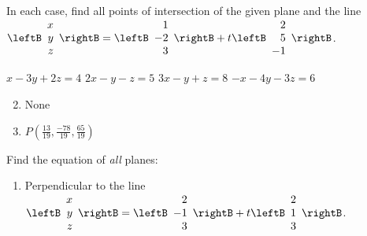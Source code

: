 \begin{multicols}{2}
\begin{ex}
In each case, find all points of intersection of the given plane and the line \newline$\leftB
\begin{array}{r}
x\\
y\\
z
\end{array}
\rightB
=
\leftB
\begin{array}{r}
1\\
-2\\
3
\end{array}
\rightB
+t
\leftB
\begin{array}{r}
2\\
5\\
-1
\end{array}
\rightB$.

\begin{exenumerate}
\exitem $x -3y + 2z = 4$
\exitem $2x - y - z = 5$
\exitem $3x - y + z = 8$
\exitem $-x -4y -3z = 6$
\end{exenumerate}
\begin{sol}
\begin{enumerate}[label={\alph*.}]
\setcounter{enumi}{1}
\item  None

\setcounter{enumi}{3}
\item  $P(\frac{13}{19}, \frac{-78}{19}, \frac{65}{19})$


\end{enumerate}
\end{sol}
\end{ex}

\begin{ex}
Find the equation of \textit{all} planes:


\begin{enumerate}[label={\alph*.}]
\item Perpendicular to the line  \\
$\leftB
\begin{array}{r}
x\\
y\\
z
\end{array}
\rightB
=
\leftB
\begin{array}{r}
2\\
-1\\
3
\end{array}
\rightB
+t
\leftB
\begin{array}{r}
2\\
1\\
3
\end{array}
\rightB$.


\end{enumerate}
\end{ex}
\end{multicols}
